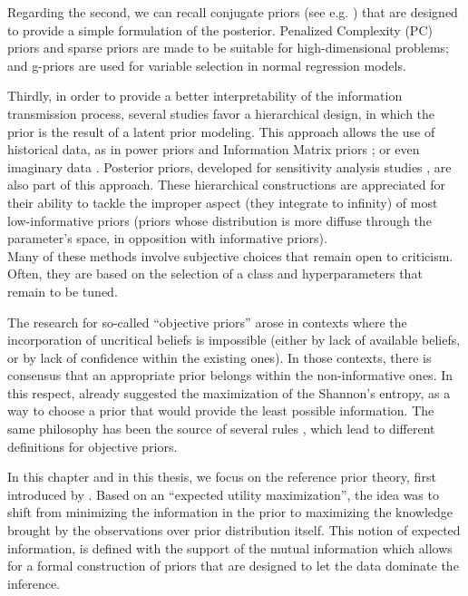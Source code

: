 Regarding the second, we can recall conjugate priors (see e.g. \cite{robert_bayesian_2007}) that are designed to provide a simple formulation of the posterior. Penalized Complexity (PC) priors \citep{simpson_penalising_2017} and sparse priors \citep{castillo_bayesian_2015} are made to be suitable for high-dimensional problems; and g-priors \citep{liang_mixtures_2008} are used for variable selection in normal regression models.

Thirdly, in order to provide a better interpretability of the information transmission process, several studies favor a hierarchical design, in which the prior is the result of a latent prior modeling. This approach allows the use of historical data, as in power priors \citep{chen_relationship_2006} and Information Matrix priors \citep{gupta_information_2009}; or even imaginary data \citep{perez_expectedposterior_2002,spitzner_neutral-data_2011}. Posterior priors, developed for sensitivity analysis studies \citep{bousquet_discussion_2024}, are also part of this approach. %
These hierarchical constructions are appreciated for their ability to tackle the improper aspect (they integrate to infinity) of most low-informative priors
(priors whose distribution is more diffuse through the parameter's space, in opposition with informative priors).\\



Many of these  methods involve subjective choices that remain open to criticism. Often, they are based on the selection of a class and hyperparameters that remain to be tuned.

The research for so-called ``objective priors'' arose in contexts where the incorporation of uncritical beliefs is impossible (either by lack of available beliefs, or by lack of confidence within the existing ones).
In those contexts, there is consensus that an appropriate prior belongs within the non-informative ones. In this respect, \citet{lindley_measure_1956} already suggested the maximization of the Shannon's entropy, as a way to choose a prior that would provide the least possible information.
The same philosophy has been the source of several rules \citep{kass_selection_1996, datta_invariance_1996,berger_objective_2008}, which lead to different definitions for objective priors.

In this chapter and in this thesis, we focus on the reference prior theory, first introduced by \citet{bernardo_expected_1979}. 
Based on an ``expected utility maximization'',
the idea was to shift from minimizing the information in the prior to maximizing the knowledge brought by the observations over prior distribution itself.
This notion of expected information, is defined with the support of the mutual information which allows for a formal construction of priors that are designed to let the data dominate the inference.


